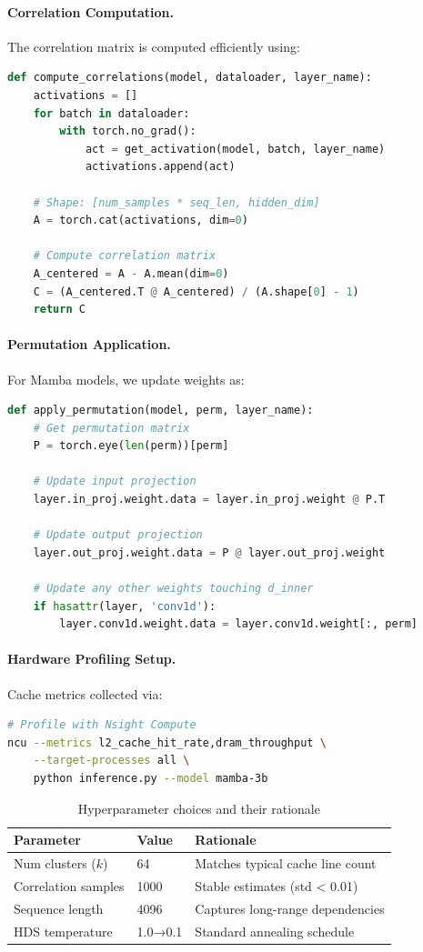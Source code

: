 \documentclass{article}
\begin{document}
\paragraph{Correlation Computation.}
The correlation matrix is computed efficiently using:
\begin{lstlisting}[language=Python]
def compute_correlations(model, dataloader, layer_name):
    activations = []
    for batch in dataloader:
        with torch.no_grad():
            act = get_activation(model, batch, layer_name)
            activations.append(act)
    
    # Shape: [num_samples * seq_len, hidden_dim]
    A = torch.cat(activations, dim=0)  
    
    # Compute correlation matrix
    A_centered = A - A.mean(dim=0)
    C = (A_centered.T @ A_centered) / (A.shape[0] - 1)
    return C
\end{lstlisting}

\paragraph{Permutation Application.}
For Mamba models, we update weights as:
\begin{lstlisting}[language=Python]
def apply_permutation(model, perm, layer_name):
    # Get permutation matrix
    P = torch.eye(len(perm))[perm]
    
    # Update input projection
    layer.in_proj.weight.data = layer.in_proj.weight @ P.T
    
    # Update output projection  
    layer.out_proj.weight.data = P @ layer.out_proj.weight
    
    # Update any other weights touching d_inner
    if hasattr(layer, 'conv1d'):
        layer.conv1d.weight.data = layer.conv1d.weight[:, perm]
\end{lstlisting}

\paragraph{Hardware Profiling Setup.}
Cache metrics collected via:
\begin{lstlisting}[language=Bash]
# Profile with Nsight Compute
ncu --metrics l2_cache_hit_rate,dram_throughput \
    --target-processes all \
    python inference.py --model mamba-3b
\end{lstlisting}

\begin{table}[h]
\caption{Hyperparameter choices and their rationale}
\begin{tabular}{lll}
\toprule
\textbf{Parameter} & \textbf{Value} & \textbf{Rationale} \\
\midrule
Num clusters ($k$) & 64 & Matches typical cache line count \\
Correlation samples & 1000 & Stable estimates (std < 0.01) \\
Sequence length & 4096 & Captures long-range dependencies \\
HDS temperature & 1.0→0.1 & Standard annealing schedule \\
\bottomrule
\end{tabular}
\end{table}
\end{document}
